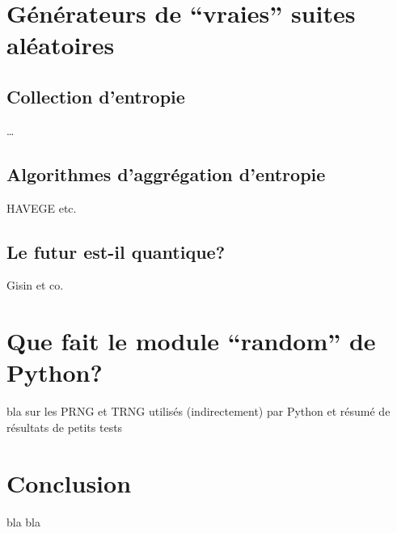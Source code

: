\documentclass{scrartcl}
\begin{document}
\section{Générateurs de ``vraies'' suites aléatoires}
\subsection{Collection d'entropie}
\ldots
\subsection{Algorithmes d'aggrégation d'entropie}
HAVEGE etc.
\subsection{Le futur est-il quantique?}
Gisin et co.

\section{Que fait le module ``random'' de Python?}
bla sur les PRNG et TRNG utilisés (indirectement) par Python et résumé de
résultats de petits tests

\section{Conclusion}
bla bla

\printbibliography
\end{document}
